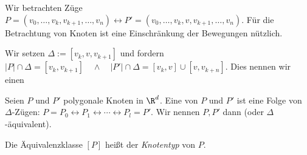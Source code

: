 Wir betrachten Züge
\begin{math}
    P = (v_0, \dotsc, v_k, v_{k+1}, \dotsc, v_n)
    \leftrightarrow
    P' = (v_0, \dotsc, v_k, v, v_{k+1}, \dotsc, v_n).
\end{math}
Für die Betrachtung von Knoten ist eine Einschränkung der Bewegungen nützlich.

Wir setzen $\Delta := [v_k, v, v_{k+1}]$ und fordern
\begin{math}
    |P| \cap \Delta = [v_k, v_{k+1}]
    \quad \land \quad
    |P'| \cap \Delta = [v_k, v] \cup [v, v_{k+n}].
\end{math}
Dies nennen wir einen 


\begin{df}
    Seien $P$ und $P'$ polygonale Knoten in $\R^d$.
    Eine  von $P$ und $P'$ ist eine Folge von $\Delta$-Zügen:
    \begin{math}
        P = P_0 \leftrightarrow P_1 \leftrightarrow \dotsb \leftrightarrow P_l = P'.
    \end{math}
    Wir nennen $P, P'$ dann  (oder $\Delta$-äquivalent).

    Die Äquivalenzklasse $[P]$ heißt der \emph{Knotentyp} von $P$.
\end{df}
